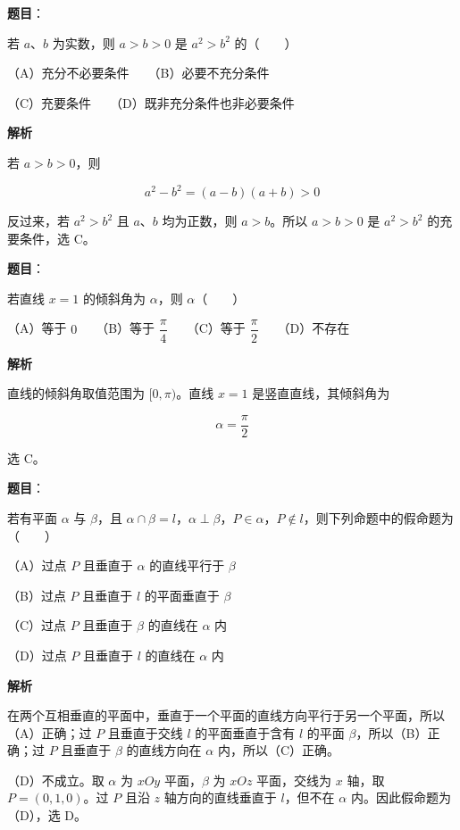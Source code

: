 \begin{answer}

\textbf{题目}：

若 $a\text{、}b$ 为实数，则 $a>b>0$ 是 $a^2>b^2$ 的\mbox{（　　）}

（A）充分不必要条件　　（B）必要不充分条件

（C）充要条件　　（D）既非充分条件也非必要条件

\textbf{解析}

若 $a>b>0$，则

\nopagebreak[4]
\[
a^2-b^2=(a-b)(a+b)>0
\]

反过来，若 $a^2>b^2$ 且 $a\text{、}b$ 均为正数，则 $a>b$。所以 $a>b>0$ 是 $a^2>b^2$ 的充要条件，选 C。


\end{answer}
\begin{answer}

\textbf{题目}：

若直线 $x=1$ 的倾斜角为 $\alpha$，则 $\alpha$\mbox{（　　）}

（A）等于 $0$　　（B）等于 $\dfrac\pi4$　　（C）等于 $\dfrac\pi2$　　（D）不存在

\textbf{解析}

直线的倾斜角取值范围为 $[0,\pi)$。直线 $x=1$ 是竖直直线，其倾斜角为

\nopagebreak[4]
\[
\alpha=\frac\pi2
\]

选 C。


\end{answer}
\begin{answer}

\textbf{题目}：

若有平面 $\alpha$ 与 $\beta$，且 $\alpha\cap\beta=l$，$\alpha\perp\beta$，$P\in\alpha$，$P\notin l$，则下列命题中的假命题为\mbox{（　　）}

（A）过点 $P$ 且垂直于 $\alpha$ 的直线平行于 $\beta$

（B）过点 $P$ 且垂直于 $l$ 的平面垂直于 $\beta$

（C）过点 $P$ 且垂直于 $\beta$ 的直线在 $\alpha$ 内

（D）过点 $P$ 且垂直于 $l$ 的直线在 $\alpha$ 内

\textbf{解析}

在两个互相垂直的平面中，垂直于一个平面的直线方向平行于另一个平面，所以（A）正确；过 $P$ 且垂直于交线 $l$ 的平面垂直于含有 $l$ 的平面 $\beta$，所以（B）正确；过 $P$ 且垂直于 $\beta$ 的直线方向在 $\alpha$ 内，所以（C）正确。

（D）不成立。取 $\alpha$ 为 $xOy$ 平面，$\beta$ 为 $xOz$ 平面，交线为 $x$ 轴，取 $P=(0,1,0)$。过 $P$ 且沿 $z$ 轴方向的直线垂直于 $l$，但不在 $\alpha$ 内。因此假命题为（D），选 D。


\end{answer}
